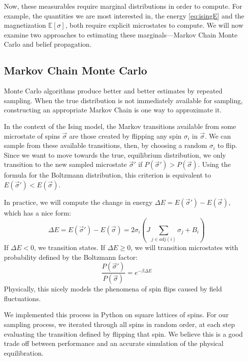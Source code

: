 \documentclass{article}
\begin{document}
Now, these measurables require marginal distributions in order to compute. 
For example, the quantities we are most interested in, the energy 
\ref{eq:isingE} and the magnetization $\mathbb{E}[\sigma]$, both require 
explicit microstates to compute. 
We will now examine two approaches to estimating these marginals—Markov Chain 
Monte Carlo and belief propagation. 
%
%
%
%
%
\subsection{Markov Chain Monte Carlo}
%
%
%
%
%
Monte Carlo algorithms produce better and better estimates by repeated sampling. 
When the true distribution is not immediately available for sampling, 
constructing an appropriate Markov Chain is one way to approximate it. 

In the context of the Ising model, the Markov transitions available from some 
microstate of spins $\vec{\sigma}$ are those created by flipping any spin 
$\sigma_i$ in $\vec{\sigma}$. 
We can sample from these available transitions, then, by choosing a random 
$\sigma_i$ to flip. 
Since we want to move towards the true, equilibrium distribution, we only 
transition to the new sampled microstate $\vec{\sigma}'$ if 
$P(\vec{\sigma}') > P(\vec{\sigma})$. 
Using the formula for the Boltzmann distribution, this criterion is equivalent 
to $E(\vec{\sigma}') < E(\vec{\sigma})$. 

In practice, we will compute the change in energy 
$\Delta E = E(\vec{\sigma}') - E(\vec{\sigma})$, which has a nice form:
\[
    \Delta E = E(\vec{\sigma}') - E(\vec{\sigma}) = 2 \sigma_i (J \sum_{j \in adj(i)} \sigma_j + B_i)
\]
If $\Delta E < 0$, we transition states. 
If $\Delta E \geq 0$, we will transition microstates with probability defined by 
the Boltzmann factor:
\[
    \frac{P(\vec{\sigma}')}{P(\vec{\sigma})}
    = e^{-\beta \Delta E} 
\]
Physically, this nicely models the phenomena of spin flips caused by field 
fluctuations. 

We implemented this process in Python on square lattices of spins. 
For our sampling process, we iterated through all spins in random order, at each 
step evaluating the transition defined by flipping that spin. 
We believe this is a good trade off between performance and an accurate 
simulation of the physical equilibration. 
\end{document}
